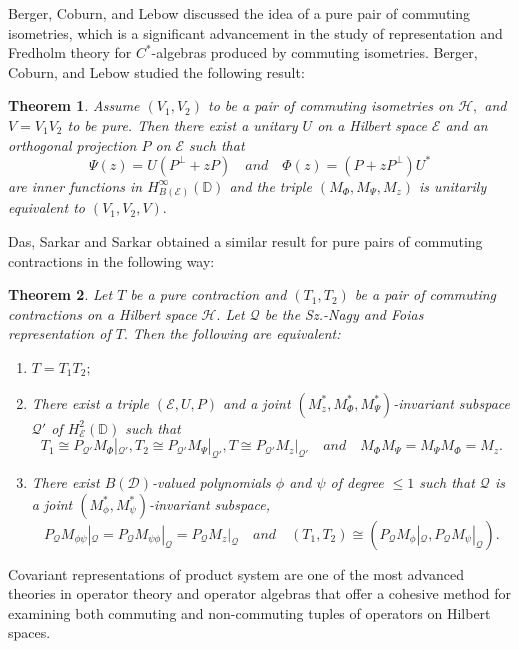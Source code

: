 \documentclass[12pt]{amsart}
\numberwithin{equation}{section}
\theoremstyle{plain}
\newtheorem{theorem}{Theorem}[section]
\begin{document}
	Berger, Coburn, and Lebow \cite{BCL78} discussed the idea of a pure pair of commuting isometries, which is a significant advancement in the study of representation and Fredholm theory for $C^*$-algebras produced by commuting isometries. Berger, Coburn, and Lebow \cite{BCL78} studied the following result:
		\begin{theorem}
		 Assume $(V_1, V_2)$ to be a pair of commuting isometries on $\mathcal{H},$ and $V = V_1 V_2$ to be pure. Then there exist a unitary $U$ on a Hilbert space $\mathcal{E}$ and an orthogonal projection $P$ on $\mathcal{E}$ such that
		\[
		{\Psi}(z)=U(P^{\perp}+zP)
		 \quad and \quad {\Phi}(z)=(P+zP^{\perp})U^* 
		\]
		are  inner functions   in $H^\infty_{B(\mathcal{E})}(\mathbb{D})$  and  the triple $(M_{\Phi}, M_{\Psi}, M_z)$ is unitarily equivalent to $(V_1, V_2, V).$
	\end{theorem}
	Das, Sarkar and Sarkar \cite{DSS17} obtained a similar result for pure pairs of commuting contractions in the following way:
	\begin{theorem}
		Let $T$ be a pure contraction and $(T_1,T_2)$ be a pair of commuting
		contractions on a Hilbert space $\mathcal{H}.$ Let $\mathcal{Q}$ be the Sz.-Nagy and Foias representation of $T.$ Then the following are equivalent:
		\begin{enumerate}
			\item $T=T_1T_2;$
			\item There exist a triple $(\mathcal{E}, U, P )$ and a joint $(M_z^*,M_{\Phi}^*,M_{\Psi}^*)$-invariant subspace $\mathcal{Q}'$ of $H_{\mathcal{E}}^2(\mathbb{D})$
			such that $$T_1\cong P_{\mathcal{Q}'}M_{\Phi}|_{\mathcal{Q}'},T_2\cong P_{\mathcal{Q}'}M_{\Psi}|_{\mathcal{Q}'},T\cong P_{\mathcal{Q}'}M_{z}|_{\mathcal{Q}'}\quad and \quad M_{\Phi}M_{\Psi}=M_{\Psi}M_{\Phi}=M_{z}.$$
			\item There exist $B(\mathcal{D})$-valued polynomials $\phi$ and $\psi$ of degree $\le 1$ such that $\mathcal{Q}$ is a joint
			$(M_{\phi}^*,M_{\psi}^*)$-invariant subspace, $$P_{\mathcal{Q}}M_{\phi\psi}|_{\mathcal{Q}}=P_{\mathcal{Q}}M_{\psi\phi}|_{\mathcal{Q}}=P_{\mathcal{Q}}M_{z}|_{\mathcal{Q}} \quad and \quad (T_1,T_2)\cong (P_{\mathcal{Q}}M_{\phi}|_{\mathcal{Q}},P_{\mathcal{Q}}M_{\psi}|_{\mathcal{Q}}).$$
		\end{enumerate}
		\end{theorem}
	
	Covariant representations of product system are one of the most advanced theories in operator theory and operator algebras that offer a cohesive method for examining both commuting and non-commuting tuples of operators on Hilbert spaces.
	
\end{document}
